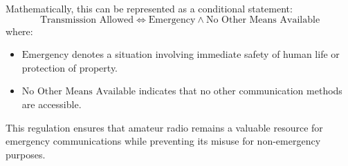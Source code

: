 Mathematically, this can be represented as a conditional statement:
\[
\text{Transmission Allowed} \iff \text{Emergency} \land \text{No Other Means Available}
\]
where:
\begin{itemize}
    \item \(\text{Emergency}\) denotes a situation involving immediate safety of human life or protection of property.
    \item \(\text{No Other Means Available}\) indicates that no other communication methods are accessible.
\end{itemize}

This regulation ensures that amateur radio remains a valuable resource for emergency communications while preventing its misuse for non-emergency purposes.

